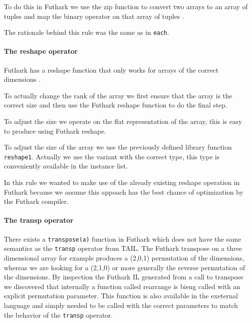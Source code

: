 \documentclass[11pt]{article}
\begin{document}
To do this in Futhark we use the zip function to convert two arrays to an array of tuples and map the binary operator on that array of tuples \cite{TroelsHenriksen}.

The rationale behind this rule was the same as in {\tt each}.

\paragraph{The reshape operator} 
Futhark has a reshape function that only works for arrays of the correct dimensions \cite{TroelsHenriksen}.

To actually change the rank of the array we first ensure that the array is the correct size and then use the Futhark reshape
function to do the final step.

To adjust the size we operate on the flat representation of the array, this is easy to produce using Futhark reshape.

To adjust the size of the array we use the previously defined library function {\tt reshape1}. Actually we use the variant with
the correct type, this type is conveniently available in the instance list.

In this rule we wanted to make use of the already existing reshape operation in Futhark because we assume this appoach has the best
chance of optimization by the Futhark compiler.

\paragraph{The transp operator} 
There exists a {\tt transpose(a)} function in Futhark which does not have the same semantics as the {\tt transp} operator from TAIL.
The Futhark transpose on a three dimensional array for example produces a (2,0,1) permutation of the dimensions, whereas we are
looking for a (2,1,0) or more generally the reverse permutation of the dimensions. By inspection the Futhark IL generated from
a call to transpose we discovered that internally a function called rearrange is bieng called with an explicit permutation parameter.
This function is also available in the exeternal language and simply needed to be called with the correct parameters to match
the behavior of the {\tt transp} operator.
\end{document}
